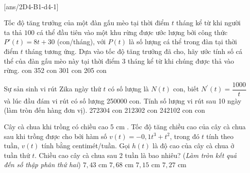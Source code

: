 \setcounter{ex}{0}
 \\
\setcounter{ex}{0}
[ans/2D4-B1-d4-1]
\begin{ex}
	Tốc độ tăng trưởng của một đàn gấu mèo tại thời điểm $t$ tháng kể từ khi người ta thả $100$ cá thể đầu tiên vào một khu rừng được ước lượng bởi công thức $P'(t)=8t+30$ (con/tháng), với $P(t)$ là số lượng cá thể trong đàn tại thời điểm $t$ tháng tương ứng. Dựa vào tốc độ tăng trưởng đã cho, hãy ước tính số cá thể của đàn gấu mèo này tại thời điểm $3$ tháng kể từ khi chúng được thả vào rừng.
	\choice
	{ con }
	{ 352 con}
	{ 301 con}
	{ 205 con}
\end{ex}
\begin{ex}
	Sự sản sinh vi rút Zika ngày thứ $t$ có số lượng là $N(t)$ con, biết $N^{\prime}(t)=\dfrac{1000}{t}$ và lúc đầu đám vi rút có số lượng 250000 con. Tính số lượng vi rút sau 10 ngày (làm tròn đến hàng đơn vị).
	\choice
	{272304 con}
	{212302 con}
	{242102 con}
	{ con}
\end{ex}
\begin{ex}
	Cây cà chua khi trồng có chiều cao 5 cm . Tốc độ tăng chiều cao của cây cà chua sau khi trồng được cho bởi hàm số $v(t)=-0,1 t^3+t^2$, trong đó $t$ tính theo tuần, $v(t)$ tính bằng centimét/tuần. Gọi $h(t)$ là độ cao của cây cà chua ở tuần thứ $t$. Chiều cao cây cà chua sau 2 tuần là bao nhiêu? (\textit{Làm tròn kết quả đến số thập phân thứ hai})
	\choice
	{$7,43$ cm}
	{$7,68$ cm}
	{$7,15$ cm}
	{\True $7,27$ cm}
\end{ex}
